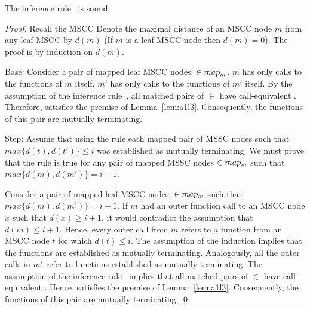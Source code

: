 {\begin{theorem}
The inference rule\mbox{\ \mtermdp} is sound.
\end{theorem}
\begin{proof}
Recall the MSCC  Denote the maximal distance of an MSCC node $m$ from any leaf
MSCC by $d(m)$ (If $m$ is a leaf MSCC node then $d(m) = 0$). The proof is by
induction on $d(m)$.

Base: Consider a pair of mapped leaf MSCC nodes:  $\in map_m$. $m$ has only calls to the functions of $m$ itself. $m'$ has only calls to the functions of $m'$ itself. By the assumption of the inference rule\mbox{\ \mtermd}, all matched pairs of  $\in$  have call-equivalent . Therefore,  satisfies the premise of Lemma~\ref{lem:a1l3}. Consequently, the functions of this pair are mutually terminating.

Step: Assume that using the rule each mapped pair of MSSC nodes  such that $max\{d(t), d(t')\} \le i$ was established as mutually terminating. We must prove that the rule is true for any pair of mapped MSSC nodes  $\in map_m$ such that $max\{d(m), d(m')\} = i+1$.

Consider a pair of mapped leaf MSCC nodes,  $\in map_m$ such that $max\{d(m), d(m')\} = i+1$.
If $m$ had an outer function call to an MSCC node $x$ such that $d(x) \ge i+1$, it would contradict the assumption that $d(m) \le i+1$. Hence, every outer call from $m$ refers to a function from an MSCC node $t$ for which $d(t) \le i$. The assumption of the induction implies that the functions are established as mutually terminating. Analogously, all the outer calls in $m'$ refer to functions established as mutually terminating. The assumption of the inference rule\mbox{\ \mtermd} implies that all matched pairs of  $\in$  have call-equivalent . Hence,  satisfies the premise of Lemma~\ref{lem:a1l3}. Consequently, the functions of this pair are mutually terminating.
\qed
\end{proof}
}

